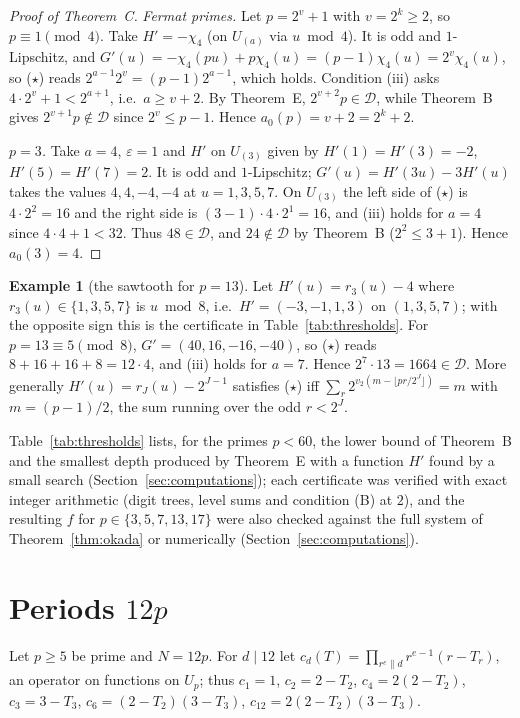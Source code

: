 \documentclass[11pt,a4paper]{article}
\theoremstyle{definition}
\newtheorem{example}[theorem]{Example}
\theoremstyle{remark}
\newcommand{\cD}{\mathcal{D}}
\newcommand{\Uu}[1]{U_{(#1)}}
\begin{document}
\begin{proof}[Proof of Theorem~C]
\emph{Fermat primes.} Let $p=2^v+1$ with $v=2^k\ge2$, so $p\equiv1\pmod 4$. Take $H'=-\chi_4$ (on $\Uu a$ via $u\bmod 4$). It is odd and $1$-Lipschitz, and $G'(u)=-\chi_4(pu)+p\chi_4(u)=(p-1)\chi_4(u)=2^v\chi_4(u)$, so ($\star$) reads $2^{a-1}2^v=(p-1)2^{a-1}$, which holds. Condition (iii) asks $4\cdot2^v+1<2^{a+1}$, i.e.\ $a\ge v+2$. By Theorem~E, $2^{v+2}p\in\cD$, while Theorem~B gives $2^{v+1}p\notin\cD$ since $2^{v}\le p-1$. Hence $a_0(p)=v+2=2^k+2$.

\emph{$p=3$.} Take $a=4$, $\varepsilon=1$ and $H'$ on $\Uu3$ given by $H'(1)=H'(3)=-2$, $H'(5)=H'(7)=2$. It is odd and $1$-Lipschitz; $G'(u)=H'(3u)-3H'(u)$ takes the values $4,4,-4,-4$ at $u=1,3,5,7$. On $\Uu3$ the left side of ($\star$) is $4\cdot2^2=16$ and the right side is $(3-1)\cdot4\cdot2^1=16$, and (iii) holds for $a=4$ since $4\cdot4+1<32$. Thus $48\in\cD$, and $24\notin\cD$ by Theorem~B ($2^2\le3+1$). Hence $a_0(3)=4$.
\end{proof}

\begin{example}[the sawtooth for $p=13$]\label{ex:13}
Let $H'(u)=r_3(u)-4$ where $r_3(u)\in\{1,3,5,7\}$ is $u\bmod 8$, i.e.\ $H'=(-3,-1,1,3)$ on $(1,3,5,7)$; with the opposite sign this is the certificate in Table~\ref{tab:thresholds}. For $p=13\equiv5\pmod 8$, $G'=(40,16,-16,-40)$, so ($\star$) reads $8+16+16+8=12\cdot4$, and (iii) holds for $a=7$. Hence $2^7\cdot13=1664\in\cD$. More generally $H'(u)=r_J(u)-2^{J-1}$ satisfies ($\star$) iff $\sum_{r}2^{v_2(m-\lfloor pr/2^J\rfloor)}=m$ with $m=(p-1)/2$, the sum running over the odd $r<2^J$.
\end{example}

Table~\ref{tab:thresholds} lists, for the primes $p<60$, the lower bound of Theorem~B and the smallest depth produced by Theorem~E with a function $H'$ found by a small search (Section~\ref{sec:computations}); each certificate was verified with exact integer arithmetic (digit trees, level sums and condition (B) at $2$), and the resulting $f$ for $p\in\{3,5,7,13,17\}$ were also checked against the full system of Theorem~\ref{thm:okada} or numerically (Section~\ref{sec:computations}).

\section{Periods \texorpdfstring{$12p$}{12p}}\label{sec:12p}

Let $p\ge5$ be prime and $N=12p$. For $d\mid12$ let $c_d(T)=\prod_{r^e\parallel d}r^{e-1}(r-T_r)$, an operator on functions on $U_p$; thus $c_1=1$, $c_2=2-T_2$, $c_4=2(2-T_2)$, $c_3=3-T_3$, $c_6=(2-T_2)(3-T_3)$, $c_{12}=2(2-T_2)(3-T_3)$.
\end{document}
